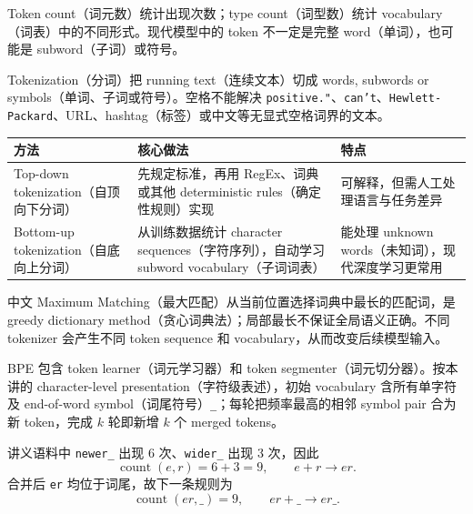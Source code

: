 Token count（词元数）统计出现次数；type count（词型数）统计 vocabulary（词表）中的不同形式。现代模型中的 token 不一定是完整 word（单词），也可能是 subword（子词）或符号。


Tokenization（分词）把 running text（连续文本）切成 words, subwords or symbols（单词、子词或符号）。空格不能解决 \texttt{positive."}、\texttt{can't}、\texttt{Hewlett-Packard}、URL、hashtag（标签）或中文等无显式空格词界的文本。

\begin{center}
\small
\begin{tabularx}{\textwidth}{@{}>{\raggedright\arraybackslash}p{3.7cm}XX@{}}
  \toprule
  方法 & 核心做法 & 特点 \\
  \midrule
  Top-down tokenization（自顶向下分词） & 先规定标准，再用 RegEx、词典或其他 deterministic rules（确定性规则）实现 & 可解释，但需人工处理语言与任务差异 \\
  Bottom-up tokenization（自底向上分词） & 从训练数据统计 character sequences（字符序列），自动学习 subword vocabulary（子词词表） & 能处理 unknown words（未知词），现代深度学习更常用 \\
  \bottomrule
\end{tabularx}
\end{center}

中文 Maximum Matching（最大匹配）从当前位置选择词典中最长的匹配词，是 greedy dictionary method（贪心词典法）；局部最长不保证全局语义正确。不同 tokenizer 会产生不同 token sequence 和 vocabulary，从而改变后续模型输入。



BPE 包含 token learner（词元学习器）和 token segmenter（词元切分器）。按本讲的 character-level presentation（字符级表述），初始 vocabulary 含所有单字符及 end-of-word symbol（词尾符号）\texttt{\_}；每轮把频率最高的相邻 symbol pair 合为新 token，完成 $k$ 轮即新增 $k$ 个 merged tokens。

讲义语料中 \texttt{newer\_} 出现 6 次、\texttt{wider\_} 出现 3 次，因此
\[
  \operatorname{count}(e,r)=6+3=9,
  \qquad e+r\rightarrow er.
\]
合并后 \texttt{er} 均位于词尾，故下一条规则为
\[
  \operatorname{count}(er,\_)=9,
  \qquad er+\_\rightarrow er\_.
\]

